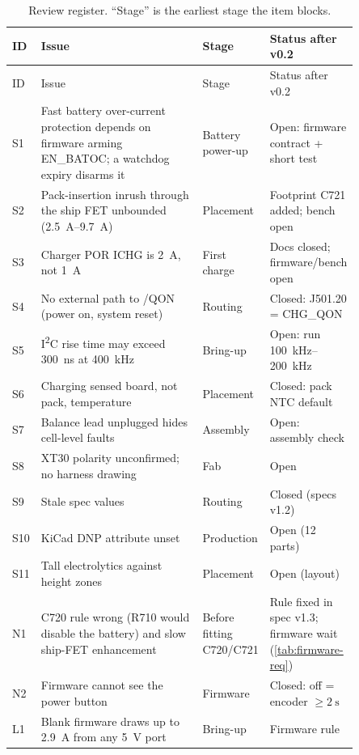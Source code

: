 {\small
\setlength{\tabcolsep}{4pt}
\begin{longtable}{@{}l >{\raggedright\arraybackslash}p{0.50\linewidth} >{\raggedright\arraybackslash}p{0.15\linewidth} >{\raggedright\arraybackslash}p{0.20\linewidth}@{}}
\caption{Review register. ``Stage'' is the earliest stage the item blocks.}\label{tab:register}\\
\toprule
ID & Issue & Stage & Status after v0.2 \\
\midrule
\endfirsthead
\toprule ID & Issue & Stage & Status after v0.2 \\ \midrule
\endhead
\bottomrule
\endfoot
S1 & Fast battery over-current protection depends on firmware arming EN\_BATOC; a watchdog expiry disarms it & Battery power-up & Open: firmware contract + short test \\
S2 & Pack-insertion inrush through the ship FET unbounded (\qtyrange{2.5}{9.7}{\ampere}) & Placement & Footprint C721 added; bench open \\
S3 & Charger POR ICHG is \qty{2}{\ampere}, not \qty{1}{\ampere} & First charge & Docs closed; firmware/bench open \\
S4 & No external path to /QON (power on, system reset) & Routing & Closed: J501.20 = CHG\_QON \\
S5 & I\textsuperscript{2}C rise time may exceed \qty{300}{\nano\second} at \qty{400}{\kilo\hertz} & Bring-up & Open: run \qtyrange{100}{200}{\kilo\hertz} \\
S6 & Charging sensed board, not pack, temperature & Placement & Closed: pack NTC default \\
S7 & Balance lead unplugged hides cell-level faults & Assembly & Open: assembly check \\
S8 & XT30 polarity unconfirmed; no harness drawing & Fab & Open \\
S9 & Stale spec values & Routing & Closed (specs v1.2) \\
S10 & KiCad DNP attribute unset & Production & Open (12 parts) \\
S11 & Tall electrolytics against height zones & Placement & Open (layout) \\
N1 & C720 rule wrong (R710 would disable the battery) and slow ship-FET enhancement & Before fitting C720/C721 & Rule fixed in spec v1.3; firmware wait (\cref{tab:firmware-req}) \\
N2 & Firmware cannot see the power button & Firmware & Closed: off = encoder $\ge\qty{2}{\second}$ \\
L1 & Blank firmware draws up to \qty{2.9}{\ampere} from any \qty{5}{\volt} port & Bring-up & Firmware rule \\

\end{longtable}}
